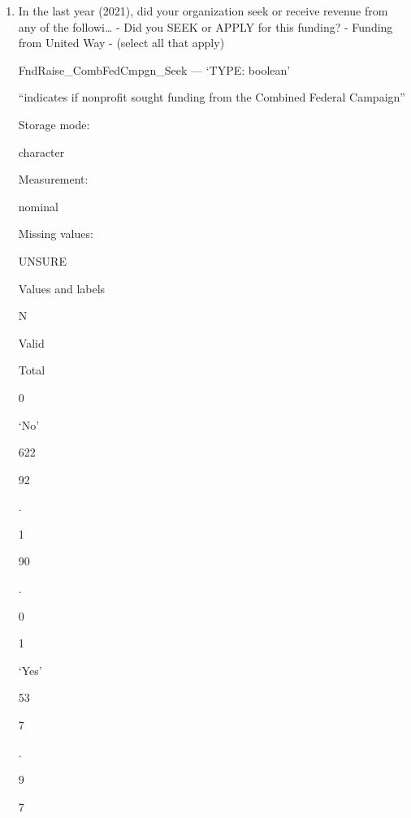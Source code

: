 \documentclass[
  letterpaper,
]{scrbook}
\providecommand{\tightlist}{%
  \setlength{\itemsep}{0pt}\setlength{\parskip}{0pt}}\usepackage{longtable,booktabs,array}
\begin{document}
\begin{enumerate}
\begin{enumerate}
\begin{enumerate}
\begin{enumerate}
\begin{enumerate}
\begin{enumerate}
\begin{enumerate}
\begin{enumerate}
\begin{enumerate}
\begin{enumerate}
                    \begin{enumerate}
                    \def\labelenumxi{\arabic{enumxi}.}
                    \tightlist
                    \item
                      In the last year (2021), did your organization
                      seek or receive revenue from any of the
                      followi\ldots{} - Did you SEEK or APPLY for this
                      funding? - Funding from United Way - (select all
                      that apply)

                      FndRaise\_CombFedCmpgn\_Seek --- {`TYPE: boolean'}

                      ``indicates if nonprofit sought funding from the
                      Combined Federal Campaign''

                      Storage mode:

                      character

                      Measurement:

                      nominal

                      Missing values:

                      UNSURE

                      Values and labels

                      N

                      Valid

                      Total

                      0

                      `No'

                      622

                      92

                      .

                      1

                      90

                      .

                      0

                      1

                      `Yes'

                      53

                      7

                      .

                      9

                      7


\end{enumerate}
\end{enumerate}
\end{enumerate}
\end{enumerate}
\end{enumerate}
\end{enumerate}
\end{enumerate}
\end{enumerate}
\end{enumerate}
\end{enumerate}
\end{enumerate}
\end{document}
